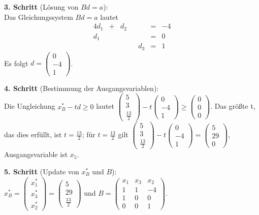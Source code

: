 \documentclass[10pt,a4paper,oneside,ngerman,numbers=noenddot]{scrartcl}
\begin{document}
		\textbf{3. Schritt} (Lösung von $Bd = a$):\\
		Das Gleichungssystem $Bd = a$ lautet
		\begin{alignat*}{4}
			d_{1} &+& d_{2} && &=& -4\\
			d_{1} && && &=& 0 \\
			&& && d_{3} &=& 1
		\end{alignat*}
		Es folgt $d = \begin{pmatrix} 0 \\ -4 \\ 1 \end{pmatrix}$.
		
		\textbf{4. Schritt} (Bestimmung der Ausgangsvariablen):\\
		Die Ungleichung $x_{B}^{*} - td \geq 0$ lautet $\begin{pmatrix} 5 \\ 3 \\ \frac{13}{2}\end{pmatrix} - t \begin{pmatrix}0 \\ -4 \\ 1 \end{pmatrix} \geq \begin{pmatrix} 0 \\ 0 \\ 0 \end{pmatrix}$. Das größte t, das dies erfüllt, ist $t = \frac{13}{2}$; für $t = \frac{13}{2}$ gilt $\begin{pmatrix} 5 \\ 3 \\ \frac{13}{2}\end{pmatrix} - t \begin{pmatrix} 0 \\ -4 \\ 1 \end{pmatrix} = \begin{pmatrix} 5 \\ 29 \\ 0 \end{pmatrix}$, Ausgangsvariable ist $x_{5}$.
		
		\textbf{5. Schritt} (Update von $x_{B}^{*}$ und $B$):\\
		$x_{B}^{*} = \begin{pmatrix} x_{1}^{*} \\ x_{3}^{*} \\ x_{2}^{*} \end{pmatrix} = \begin{pmatrix} 5 \\ 29 \\ \frac{13}{2} \end{pmatrix}$ und $B = \begin{pmatrix} x_{1} & x_{3} & x_{2} \\ 1 & 1 & -4 \\ 1 & 0 & 0 \\ 0 & 0 & 1 \end{pmatrix}$.
		
\end{document}
